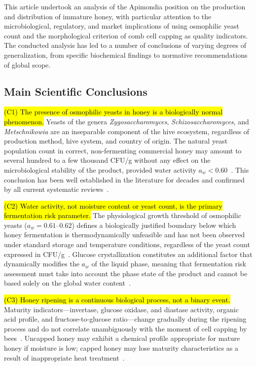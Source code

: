 \documentclass[foods,review,accept,pdftex,moreauthors]{Definitions/mdpi}
\begin{document}
{This article undertook an analysis of the Apimondia position
on the production and distribution of immature honey, with
particular attention to the microbiological, regulatory, and
market implications of using osmophilic yeast count and the
morphological criterion of comb cell capping as quality indicators.
The conducted analysis has led to a number of conclusions of varying
degrees of generalization, from specific biochemical findings
to normative recommendations of global scope.


\subsection{Main Scientific Conclusions}


{\hl{(C1) The presence of osmophilic yeasts in honey is a biologically normal phenomenon.}}
Yeasts of the genera \textit{Zygosaccharomyces}, \textit{Schizosaccharomyces},
and \textit{Metschnikowia} are an inseparable component of the hive
ecosystem, regardless of production method, hive system, and country
of origin. The natural yeast population count in correct, non-fermenting
commercial honey may amount to several hundred to a few thousand CFU/g
without any effect on the microbiological stability of the product,
provided water activity $a_w < 0.60$~\cite{ruegg1981}.
This conclusion has been well established in the literature for decades
and confirmed by all current systematic
reviews~\cite{biochemreactions2022,rodriguezmachado2024}.

{\hl{(C2) Water activity, not moisture content or yeast count, is the primary fermentation risk parameter.}}
The physiological growth threshold of osmophilic yeasts
($a_w = 0.61$--$0.62$) defines a biologically justified
boundary below which honey fermentation is  {thermodynamically unfeasible and has not been
observed under standard storage and temperature conditions,}
regardless of the yeast count expressed in
CFU/g~\cite{waaw2006,ruegg1981}.
Glucose crystallization constitutes an additional factor that
dynamically modifies the $a_w$ of the liquid phase, meaning that
fermentation risk assessment must take into account the phase state
of the product and cannot be based solely on the global water
content~\cite{zamora2006,ijfans2019}.

{\hl{(C3) Honey ripening is a continuous biological process, not a binary event.}}
Maturity indicators---invertase, glucose oxidase, and diastase
activity, organic acid profile, and fructose-to-glucose ratio---change gradually during the ripening process and do not correlate
unambiguously with the moment of cell capping by
bees~\cite{zhang2021,sun2021}.
Uncapped honey may exhibit a chemical profile appropriate for
mature honey if moisture is low; capped honey may lose maturity
characteristics as a result of inappropriate heat
treatment~\cite{codex_stan12,guo2020,zhang2021}.

}
\end{document}
